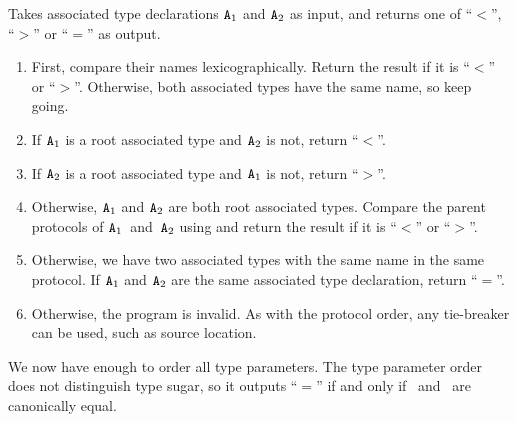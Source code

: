\documentclass[../generics]{subfiles}
\begin{document}
%
\begin{algorithm}\label{associated type order}%
Takes associated type declarations $\texttt{A}_1$ and $\texttt{A}_2$ as input, and returns one of ``$<$'', ``$>$'' or ``$=$'' as output.
\begin{enumerate}
\item First, compare their names lexicographically. Return the result if it is ``$<$'' or ``$>$''. Otherwise, both associated types have the same name, so keep going.
\item If $\texttt{A}_1$ is a root associated type and $\texttt{A}_2$ is not, return ``$<$''.
\item If $\texttt{A}_2$ is a root associated type and $\texttt{A}_1$ is not, return ``$>$''.
\item Otherwise, $\texttt{A}_1$ and $\texttt{A}_2$ are both root associated types. Compare the parent protocols of $\texttt{A}_1$~and~$\texttt{A}_2$ using  and return the result if it is ``$<$'' or ``$>$''.
\item Otherwise, we have two associated types with the same name in the same protocol. If $\texttt{A}_1$ and $\texttt{A}_2$ are the same associated type declaration, return ``$=$''.
\item Otherwise, the program is invalid. As with the protocol order, any tie-breaker can be used, such as source location.
\end{enumerate}
\end{algorithm}

We now have enough to order all type parameters. The type parameter order does not distinguish type sugar, so it outputs ``$=$'' if and only if \tT\ and \tU\ are canonically equal.
\end{document}
